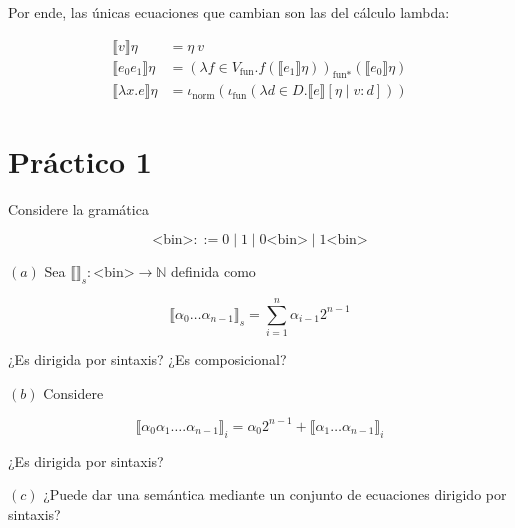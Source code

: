 \documentclass[article, 12pt]{article}
\begin{document}
Por ende, las únicas ecuaciones que cambian son las del cálculo lambda:

\begin{align*}
  \llbracket v \rrbracket\eta &= \eta ~ v \\ 
  \llbracket e_0 e_1 \rrbracket\eta &= (\lambda f \in V_{\text{fun}}.
  f(\llbracket e_1 \rrbracket\eta))_{\text{fun}*}(\llbracket e_0 \rrbracket\eta)
  \\ 
  \llbracket \lambda x.e \rrbracket\eta &=
  \iota_{\text{norm}}(\iota_{\text{fun}}(\lambda d \in D. \llbracket e
  \rrbracket[\eta \mid v : d]))
\end{align*}

































\pagebreak
\section{Práctico 1}

\begin{myframe}
  Considere la gramática 

  \begin{equation*}
    \text{<bin>} ::= 0 \mid 1 \mid 0\text{<bin>} \mid 1\text{<bin>}
  \end{equation*}

  $(a)$ Sea $\llbracket  \rrbracket_s : \text{<bin>} \to \mathbb{N}$ definida
  como 

  \begin{equation*}
    \llbracket \alpha_0\ldots\alpha_{n-1} \rrbracket_{s} = \sum_{i=1}^n
    \alpha_{i-1}2^{n-1}
  \end{equation*}

  ¿Es dirigida por sintaxis? ¿Es composicional? 

  $(b)$ Considere 

  \begin{equation*}
    \llbracket \alpha_0 \alpha_1 \ldots. \alpha_{n-1} \rrbracket_i =
    \alpha_{0} 2^{n-1} + \llbracket \alpha_1 \ldots \alpha_{n-1} \rrbracket_i
  \end{equation*}

  ¿Es dirigida por sintaxis? 

  $(c)$ ¿Puede dar una semántica mediante un conjunto de ecuaciones dirigido por
  sintaxis?
\end{myframe}
\end{document}
